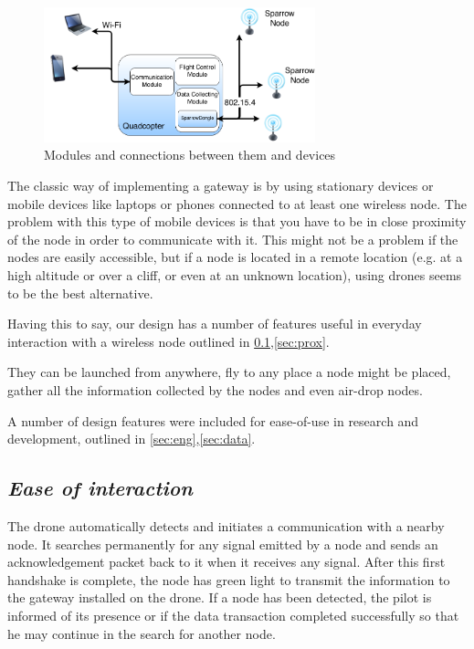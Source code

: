 \label{chap:arch}

\begin{figure}[ht] \centering
\includegraphics[width=0.7\textwidth]{img/organigrama.png}
\caption{Modules and connections between them and devices} \end{figure}

The classic way of implementing a gateway is by using stationary devices or mobile devices like laptops or phones connected to at least one wireless node. The problem with this type of mobile devices is that you have to be in close proximity of the node in order to communicate with it. This might not be a problem if the nodes are easily accessible, but if a node is located in a remote location (e.g. at a high altitude or over a cliff, or even at an unknown location), using drones seems to be the best alternative.

Having this to say, our design has a number of features useful in everyday interaction with a wireless node outlined in \ref{sec:inter},\ref{sec:prox}. 

They can be launched from anywhere, fly to any place a node might be placed, gather all the information collected by the nodes and even air-drop nodes.

A number of design features were included for ease-of-use in
research and development, outlined in \ref{sec:eng},\ref{sec:data}.


\subsection{\textit{Ease of interaction}} 

\label{sec:inter}

The drone automatically detects and initiates a communication with a nearby node. It searches permanently for any signal emitted by a node and sends an acknowledgement packet back to it when it receives any signal. After this first handshake is complete, the node has green light to transmit the information to the gateway installed on the drone. If a node has been detected, the pilot is informed of its presence or if the data transaction completed successfully so that he may continue in the search for another node.

